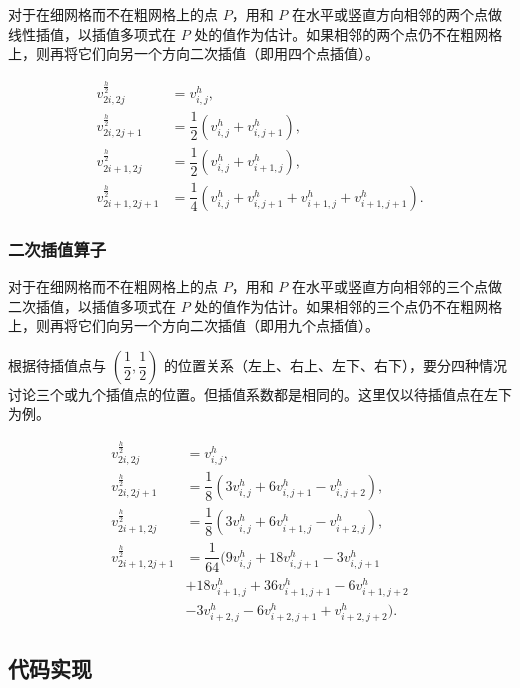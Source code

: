 \documentclass{ctexart}
\begin{document}
对于在细网格而不在粗网格上的点 $P$，用和 $P$ 在水平或竖直方向相邻的两个点做线性插值，以插值多项式在 $P$ 处的值作为估计。如果相邻的两个点仍不在粗网格上，则再将它们向另一个方向二次插值（即用四个点插值）。

\begin{equation}
\begin{split}
	v_{2i,2j}^{\frac h2} &= v_{i,j}^h,\\
	v_{2i,2j+1}^{\frac h2} &= \dfrac 12(v_{i,j}^h + v_{i,j+1}^h),\\
	v_{2i+1,2j}^{\frac h2} &= \dfrac 12(v_{i,j}^h + v_{i+1,j}^h),\\
	v_{2i+1,2j+1}^{\frac h2} &= \dfrac 14(v_{i,j}^h + v_{i,j+1}^h + v_{i+1,j}^h + v_{i+1,j+1}^h).
\end{split}
\end{equation}

\subsubsection{二次插值算子}

对于在细网格而不在粗网格上的点 $P$，用和 $P$ 在水平或竖直方向相邻的三个点做二次插值，以插值多项式在 $P$ 处的值作为估计。如果相邻的三个点仍不在粗网格上，则再将它们向另一个方向二次插值（即用九个点插值）。

根据待插值点与 $(\dfrac 12,\dfrac 12)$ 的位置关系（左上、右上、左下、右下），要分四种情况讨论三个或九个插值点的位置。但插值系数都是相同的。这里仅以待插值点在左下为例。

\begin{equation}
\begin{split}
	v_{2i,2j}^{\frac h2} & = v_{i,j}^h,\\
	v_{2i,2j+1}^{\frac h2} & = \dfrac 18(3v_{i,j}^{h} + 6v_{i,j+1}^{h} - v_{i,j+2}^{h}),\\
	v_{2i+1,2j}^{\frac h2} & = \dfrac 18(3v_{i,j}^{h} + 6v_{i+1,j}^{h} - v_{i+2,j}^{h}),\\
	v_{2i+1,2j+1}^{\frac h2}
		& = \dfrac 1{64}(9v_{i,j}^h + 18v_{i,j+1}^h - 3v_{i,j+1}^h\\
		& + 18v_{i+1,j}^h + 36v_{i+1,j+1}^h - 6v_{i+1,j+2}^h\\
		& - 3v_{i+2,j}^h - 6v_{i+2,j+1}^h + v_{i+2,j+2}^h).
\end{split}
\end{equation}

\subsection{代码实现}
\end{document}
